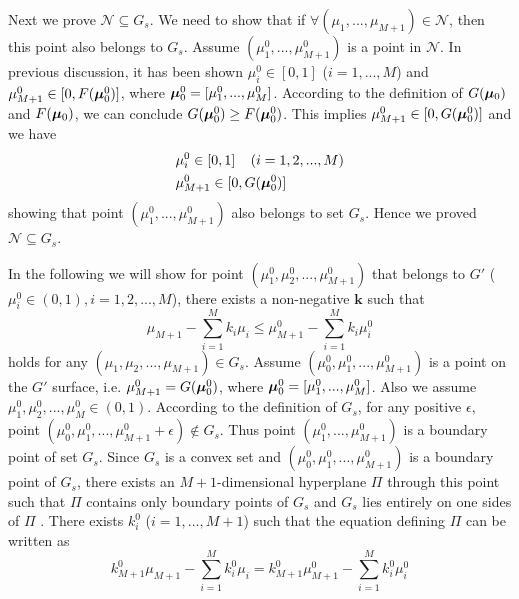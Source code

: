 Next we prove $\mathcal{N} \subseteq G_s$. We need to show that if  $\forall (\mu_1, ..., \mu_{M+1}) \in \mathcal{N}$, then this point also belongs to $G_s$.
Assume $(\mu_1^0, ..., \mu_{M+1}^0)$ is a point in $\mathcal{N}$. 
In previous discussion, it has been shown $\mu_i^0 \in [0, 1]$ ($i = 1, ..., M$) and $\mu_{M+1}^0 \in [0, F(\boldsymbol{\mu}_0^0)]$, where $\boldsymbol{\mu}_0^0 = [\mu_1^0, ..., \mu_M^0]$. 
According to the definition of $G(\boldsymbol{\mu}_0)$ and $F(\boldsymbol{\mu}_0)$, we can conclude $G(\boldsymbol{\mu}_0^0) \geq F(\boldsymbol{\mu}_0^0)$. 
This implies $\mu_{M+1}^0 \in [0, G(\boldsymbol{\mu}_0^0)]$ and we have  
\begin{equation}
\begin{split}
&\mu_i^0 \in [0, 1]\;\;\;\;(i=1, 2, ..., M)\\
&\mu_{M+1}^0 \in [0, G(\boldsymbol{\mu}_0^0)]
\end{split}
\end{equation}
showing that point $(\mu_1^0, ..., \mu_{M+1}^0)$ also belongs to set $G_s$.
Hence we proved $\mathcal{N} \subseteq G_s$. 

In the following we will show for point $(\mu_1^0, \mu_2^0, ..., \mu_{M+1}^0)$ that belongs to $G'$ ($\mu_i^0 \in (0, 1), i = 1, 2, ..., M$), there exists a non-negative $\mathbf{k}$ such that  
\[
\mu_{M+1} - \sum_{i=1}^{M}k_i\mu_i \leq \mu_{M+1}^0 - \sum_{i=1}^{M}k_i\mu_i^0
\]
holds for any $(\mu_1, \mu_2, ..., \mu_{M+1}) \in G_s$. 
Assume $(\mu_0^0, \mu_1^0, ..., \mu_{M+1}^0)$ is a point on the $G'$ surface, i.e. $\mu_{M+1}^0 = G(\boldsymbol{\mu}_0^0)$, where $\boldsymbol{\mu}_0^0 = [\mu_1^0, ..., \mu_{M}^0]$. 
Also we assume $\mu_1^0, \mu_2^0, ..., \mu_M^0 \in (0, 1)$. 
According to the definition of $G_s$, for any positive $\epsilon$, point $(\mu_0^0, \mu_1^0, ..., \mu_{M+1}^0+\epsilon) \notin G_s$. Thus point $(\mu_1^0, ..., \mu_{M+1}^0)$ is a boundary point of set $G_s$.  
Since $G_s$ is a convex set and $(\mu_0^0, \mu_1^0, ..., \mu_{M+1}^0)$ is a boundary point of $G_s$,  
there exists an $M+1$-dimensional hyperplane $\Pi$ through this point such that $\Pi$ contains only boundary points of $G_s$ and $G_s$ lies entirely on one sides of $\Pi$  \cite{dantzig1951fundamental}. 
There exists $k_i^0$ ($i=1, ..., M+1$) such that the equation defining $\Pi$ can be written as \cite{dantzig1951fundamental}
\begin{equation}
\label{PI}
k_{M+1}^0\mu_{M+1} - \sum_{i=1}^{M}k_i^0\mu_i = k_{M+1}^0\mu_{M+1}^0 - \sum_{i=1}^{M}k_i^0\mu_i^0
\end{equation}

